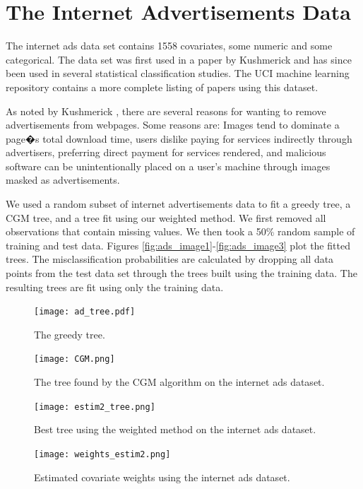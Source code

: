 \section{The Internet Advertisements Data}

The internet ads data set contains 1558 covariates, some numeric and some categorical. The data set was first used in a paper by Kushmerick \cite{kushmerick1999learning} and has since been used in several statistical classification studies. The UCI machine learning repository contains a more complete listing of papers using this dataset. 

As noted by Kushmerick \cite{kushmerick1999learning}, there are several reasons for wanting to remove advertisements from webpages. Some reasons are: Images tend to dominate a page�s total download time, users dislike paying for services indirectly through advertisers, preferring direct payment for services rendered, and malicious software can be unintentionally placed on a user's machine through images masked as advertisements. 

We used a random subset of internet advertisements data to fit a greedy tree, a CGM tree, and a tree fit using our weighted method. We first removed all observations that contain missing values. We then took a 50\% random sample of training and test data. Figures \ref{fig:ads_image1}-\ref{fig:ads_image3} plot the fitted trees. The misclassification probabilities are calculated by dropping all data points from the test data set through the trees built using the training data. The resulting trees are fit using only the training data.  
\begin{figure}[h]
\label{fig:3fig_tree}
  \texttt{[image: ad\_tree.pdf]}
  \caption[The greedy algorithm tree for the internet ads dataset.]{The greedy tree.}\label{fig:ads_image1}
\endminipage\hfill
\hspace{-1cm}
  \texttt{[image: CGM.png]}
  \caption[The CGM algorithm tree for the internet ads dataset.]{The tree found by the CGM algorithm on the internet ads dataset.}\label{fig:ads_image2}
\endminipage\hfill
\end{figure}
\begin{figure}
%
  \texttt{[image: estim2\_tree.png]}
  \caption[The weighted method tree for the internet ads dataset.]{Best tree using the weighted method on the internet ads dataset.}\label{fig:ads_image3}
\endminipage\hfill
{}%
\hspace{-1cm}
  \texttt{[image: weights\_estim2.png]}
  \caption[Estimated covariate weights for the internet ads dataset.]{Estimated covariate weights using the internet ads dataset.}\label{fig:ads_image4}
\label{fig:uci_cov_weights}
\endminipage
\end{figure}

